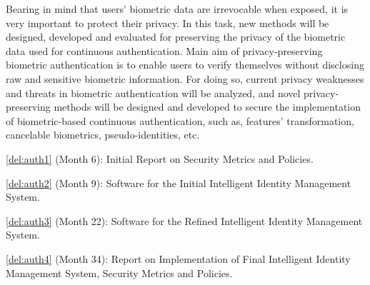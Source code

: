 \begin{Workpackage}{\thewpno}
\begin{Task}
\TaskResults{%
\ref{del:auth2},
\ref{del:auth3},
\ref{del:auth4}
}
\TaskHeader{}
Bearing in mind that users' biometric data are irrevocable when exposed, it is very important to protect their privacy. In this task, new methods will be designed, developed and evaluated for preserving the privacy of the biometric data used for continuous authentication. Main aim of privacy-preserving biometric authentication is to enable users to verify themselves without disclosing raw and sensitive biometric information. For doing so, current privacy weaknesses and threats in biometric authentication will be analyzed, and novel privacy-preserving methods will be designed and developed to secure the implementation of biometric-based continuous authentication, such as, features' transformation, cancelable biometrics, pseudo-identities, etc.
\end{Task}


\begin{WPDeliverables}
  \begin{compactitem}
\item \ref{del:auth1} (Month 6): Initial Report on Security Metrics and Policies.
\item \ref{del:auth2} (Month 9): Software for the Initial Intelligent Identity Management System.
\item \ref{del:auth3} (Month 22): Software for the Refined Intelligent Identity Management System.
\item \ref{del:auth4} (Month 34): Report on Implementation of Final Intelligent Identity Management System, Security Metrics and Policies.
\end{compactitem}
\end{WPDeliverables}
\end{Workpackage}
